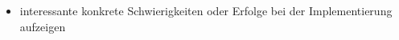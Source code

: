 \documentclass[../main/thesis.tex]{subfiles}
\begin{document}



\begin{itemize}
	\item interessante konkrete Schwierigkeiten oder Erfolge bei der Implementierung aufzeigen
\end{itemize}



\onlyinsubfile{\listoffigures}
\onlyinsubfile{}
\end{document}
